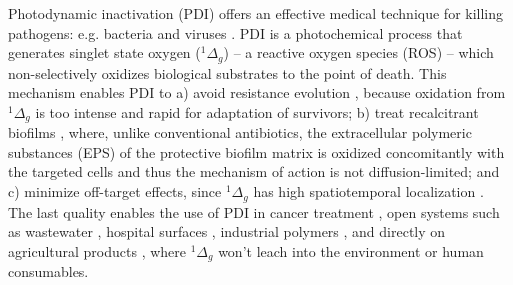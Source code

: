 Photodynamic inactivation (PDI) offers an effective medical technique for killing pathogens: e.g. bacteria \cite{Hamblin2004PhotodynamicDisease} and viruses \cite{Wigginton2010OxidationInactivation,Lebedeva2020TheViruses}. PDI is a photochemical process that generates singlet state oxygen ($^1\Delta_g$) \cite{Ergaieg2008InvolvementPorphyrin, Allen2004IntroductionSimulations, Henze2019Multi-scaleCheckpoint, Zaman2005ComputationalMatrices,Gillespie2007StochasticKinetics} -- a reactive oxygen species (ROS) \cite{Zepp1992HydroxylReaction,Koppenol2001TheLater} -- which non-selectively oxidizes biological substrates \cite{Choe2006MechanismsOxidation,Frankel1980LipidOxidation} to the point of death. This mechanism enables PDI to a) avoid resistance evolution \cite{Tavares2010AntimicrobialTreatment,Lauro2002PhotoinactivationConjugates,Pedigo2009AbsenceTherapy}, because oxidation from $^1\Delta_g$ is too intense and rapid for adaptation of survivors; b) treat recalcitrant biofilms \cite{Ghorbanzadeh2020ModulationModel}, where, unlike conventional antibiotics, the extracellular polymeric substances (EPS) of the protective biofilm matrix is oxidized concomitantly with the targeted cells \cite{Beirao2014PhotodynamicPorphyrin} and thus the mechanism of action is not diffusion-limited; and c) minimize off-target effects, since $^1\Delta_g$ has high spatiotemporal localization \cite{Moan1984TheOxygen, Moan1990OnTissues,Rodgers1982LifetimeMeasurements}. The last quality enables the use of PDI in cancer treatment \cite{Lange2019ComparisonLines}, open systems such as wastewater \cite{Kohn2007AssociationOxygen,Mostafa2013SingletMatter,Jimenez-Hernandez2006SolarSensitizers}, hospital surfaces \cite{McCoy2014PhotodynamicControl}, industrial polymers \cite{Kim2003DesignProblem}, and directly on agricultural products \cite{Luksiene2013NovelPhotosensitization,Silva2018PhotodynamicStates}, where $^1\Delta_g$ won't leach into the environment \cite{Thomas2001AntifoulingEffects,Niu2016RolesIrradiation,Winters1983ControlDesalination} or human consumables. 

